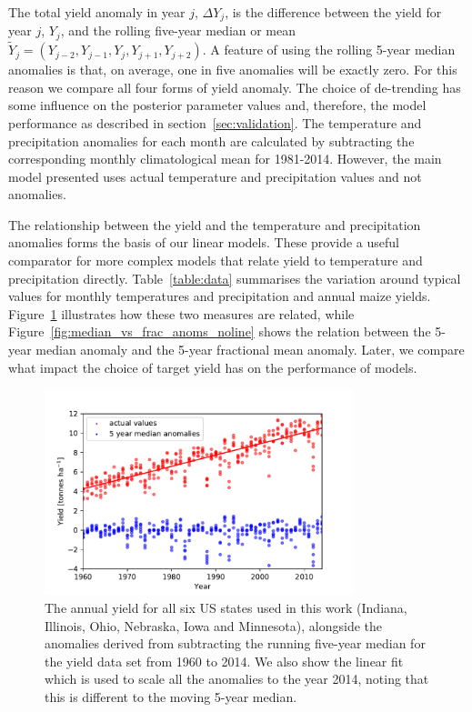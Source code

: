 \documentclass[12pt]{article}
\begin{document}
The total yield anomaly in year $j$, $\Delta Y_j$, is the difference between the yield for year $j$, $Y_j$, and the rolling five-year median or mean $\widetilde{Y}_j = (Y_{j-2},Y_{j-1},Y_{j},Y_{j+1},Y_{j+2} )$. A feature of using the rolling 5-year median anomalies is that, on average, one in five anomalies will be exactly zero. For this reason we compare all four forms of yield anomaly. The choice of de-trending has some influence on the posterior parameter values and, therefore, the model performance as described in section~\ref{sec:validation}. The temperature and precipitation anomalies for each month are calculated by subtracting the corresponding monthly climatological mean for 1981-2014. However, the main model presented uses actual temperature and precipitation values and not anomalies.

The relationship between the yield and the temperature and precipitation anomalies forms the basis of our linear models. These provide a useful comparator for more complex models that relate yield to temperature and precipitation directly. Table~\ref{table:data} summarises the variation around typical values for monthly temperatures and precipitation and annual maize yields. Figure~\ref{fig:yield_anomalies} illustrates how these two measures are related, while Figure~\ref{fig:median_vs_frac_anoms_noline} shows the relation between the 5-year median anomaly and the 5-year fractional mean anomaly. Later, we compare what impact the choice of target yield has on the performance of models.

\begin{figure}
\centering
\includegraphics[width=0.8\textwidth]{./figures/yields_vs_mean_anoms}
\caption{\label{fig:yield_anomalies} The annual yield for all six US states used in this work (Indiana, Illinois, Ohio, Nebraska, Iowa and Minnesota), alongside the anomalies derived from subtracting the running five-year median for the yield data set from 1960 to 2014. We also show the linear fit which is used to scale all the anomalies to the year 2014, noting that this is different to the moving 5-year median.}
\end{figure}
\end{document}

